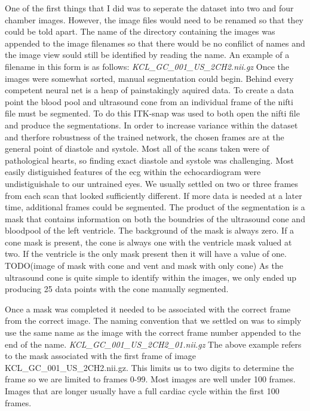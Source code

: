 \documentclass{article}
\begin{document}
One of the first things that I did was to seperate the dataset into two and four chamber images. However, the image files would need to be renamed so that they could be told apart.
The name of the directory containing the images was appended to the image filenames so that there would be no confilict of names and the image view sould still be identified by reading the name.
An example of a filename in this form is as follows:
\textit{KCL\_GC\_001\_US\_2CH2.nii.gz}
Once the images were somewhat sorted, manual segmentation could begin. Behind every competent neural net is a heap of painstakingly aquired data.
To create a data point the blood pool and ultrasound cone from an individual frame of the nifti file must be segmented. To do this ITK-snap was used to both open the nifti file and produce the segmentations.
In order to increase variance within the dataset and therfore robustness of the trained network, the chosen frames are at the general point of diastole and systole.
Most all of the scans taken were of pathological hearts, so finding exact diastole and systole was challenging.
Most easily distiguished features of the ecg within the echocardiogram were undistiguishale to our untrained eyes.
We usually settled on two or three frames from each scan that looked sufficiently different.
If more data is needed at a later time, additional frames could be segmented.
The product of the segmentation is a mask that contains information on both the boundries of the ultrasound cone and bloodpool of the left ventricle.
The background of the mask is always zero. If a cone mask is present, the cone is always one with the ventricle mask valued at two.
If the ventricle is the only mask present then it will have a value of one.
TODO(image of mask with cone and vent and mask with only cone)
As the ultrasound cone is quite simple to identify within the images, we only ended up producing 25 data points with the cone manually segmented.
\par{}
Once a mask was completed it needed to be associated with the correct frame from the correct image.
The naming convention that we settled on was to simply use the same name as the image with the correct frame number appended to the end of the name.
\textit{KCL\_GC\_001\_US\_2CH2\_01.nii.gz}
The above example refers to the mask associated with the first frame of image KCL\_GC\_001\_US\_2CH2.nii.gz.
This limits us to two digits to determine the frame so we are limited to frames 0-99.
Most images are well under 100 frames. Images that are longer usually have a full cardiac cycle within the first 100 frames.
\end{document}
